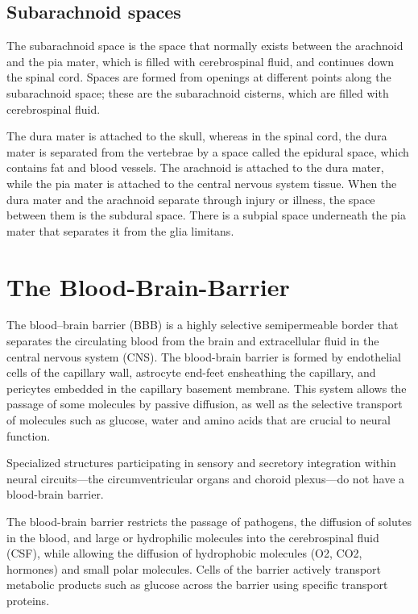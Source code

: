 \documentclass[]{book}
\begin{document}
\hypertarget{subarachnoid-spaces}{%
\subsection{Subarachnoid spaces}\label{subarachnoid-spaces}}

The subarachnoid space is the space that normally exists between the arachnoid and the pia mater, which is filled with cerebrospinal fluid, and continues down the spinal cord. Spaces are formed from openings at different points along the subarachnoid space; these are the subarachnoid cisterns, which are filled with cerebrospinal fluid.

The dura mater is attached to the skull, whereas in the spinal cord, the dura mater is separated from the vertebrae by a space called the epidural space, which contains fat and blood vessels. The arachnoid is attached to the dura mater, while the pia mater is attached to the central nervous system tissue. When the dura mater and the arachnoid separate through injury or illness, the space between them is the subdural space. There is a subpial space underneath the pia mater that separates it from the glia limitans.

\hypertarget{the-blood-brain-barrier}{%
\section{The Blood-Brain-Barrier}\label{the-blood-brain-barrier}}

The blood--brain barrier (BBB) is a highly selective semipermeable border that separates the circulating blood from the brain and extracellular fluid in the central nervous system (CNS). The blood-brain barrier is formed by endothelial cells of the capillary wall, astrocyte end-feet ensheathing the capillary, and pericytes embedded in the capillary basement membrane. This system allows the passage of some molecules by passive diffusion, as well as the selective transport of molecules such as glucose, water and amino acids that are crucial to neural function.

Specialized structures participating in sensory and secretory integration within neural circuits---the circumventricular organs and choroid plexus---do not have a blood-brain barrier.

The blood-brain barrier restricts the passage of pathogens, the diffusion of solutes in the blood, and large or hydrophilic molecules into the cerebrospinal fluid (CSF), while allowing the diffusion of hydrophobic molecules (O2, CO2, hormones) and small polar molecules. Cells of the barrier actively transport metabolic products such as glucose across the barrier using specific transport proteins.
\end{document}
